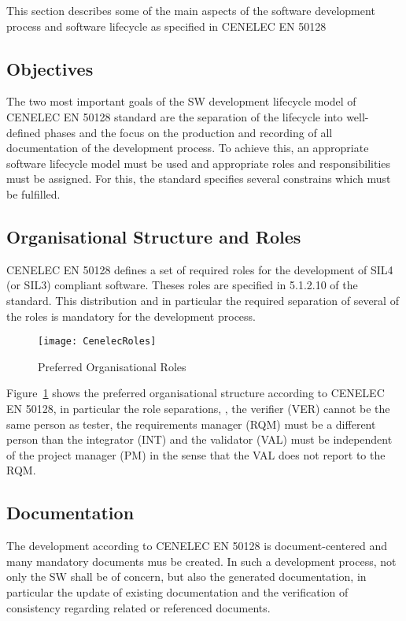 
This section describes some of the main aspects of the software development
process and software lifecycle as specified in CENELEC EN 50128

\subsection{Objectives}
\label{sec:objectives}

The two most important goals of the SW development lifecycle model of CENELEC EN
50128 standard are the separation of the lifecycle into well-defined phases and
the focus on the production and recording of all documentation of the
development process. To achieve this, an appropriate software lifecycle model
must be used and appropriate roles and responsibilities must be assigned. For
this, the standard specifies several constrains which must be fulfilled.

\subsection{Organisational Structure and Roles}
\label{sec:organ-struct-roles}

CENELEC EN 50128 defines a set of required roles for the development of SIL4 (or
SIL3) compliant software. Theses roles are specified in 5.1.2.10 of the
standard. This distribution and in particular the required separation of several
of the roles is mandatory for the development process.

\begin{figure}[ht]
  \centering
  \texttt{[image: CenelecRoles]}
  \caption{Preferred Organisational Roles~\cite{EN-50128}}
  \label{fig:preferred-roles}
\end{figure}

Figure~\ref{fig:preferred-roles} shows the preferred organisational structure
according to CENELEC EN 50128, in particular the role separations, \eg, the
verifier (VER) cannot be the same person as tester, the requirements manager
(RQM) must be a different person than the integrator (INT) and the validator
(VAL) must be independent of the project manager (PM) in the sense that the VAL
does not report to the RQM.

\subsection{Documentation}
\label{sec:documentation}

The development according to CENELEC EN 50128 is document-centered and many
mandatory documents mus be created.  In such a development process, not only the
SW shall be of concern, but also the generated documentation, in particular the
update of existing documentation and the verification of consistency regarding
related or referenced documents.

